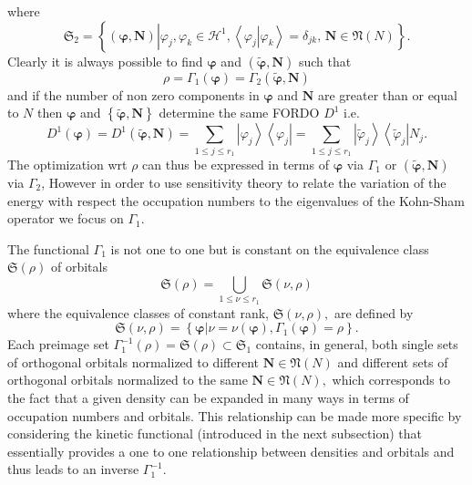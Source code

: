 \documentclass[aps,preprint]{revtex4}%
\begin{document}
where
\begin{equation}
\mathfrak{S}_{2}=\left\{  \left(  \boldsymbol{\varphi,N}\right)  \left\vert
\varphi_{j},\varphi_{k}\in\mathcal{H}^{1},\left\langle \left.  \varphi
_{j}\right\vert \varphi_{k}\right\rangle =\delta_{jk},\,\boldsymbol{N}%
\in\mathfrak{N}\left(  N\right)  \right.  \right\}  .\label{set2}%
\end{equation}
Clearly it is always possible to find $\boldsymbol{\varphi}$ and $\left(
\boldsymbol{\tilde{\varphi},N}\right)  $ such that
\begin{equation}
\rho=\Gamma_{1}\left(  \boldsymbol{\varphi}\right)  =\Gamma_{2}\left(
\boldsymbol{\tilde{\varphi},N}\right)
\end{equation}
and if the number of non zero components in $\boldsymbol{\varphi}$ and
$\boldsymbol{N}$ are greater than or equal to $N$ then $\boldsymbol{\varphi}$
and $\left\{  \boldsymbol{\tilde{\varphi},N}\right\}  $ determine the same
FORDO $D^{1}$ i.e.
\begin{equation}
D^{1}\left(  \boldsymbol{\varphi}\right)  =D^{1}\left(  \boldsymbol{\tilde
{\varphi},N}\right)  =\sum_{1\leq j\leq r_{1}}\left\vert \varphi
_{j}\right\rangle \left\langle \varphi_{j}\right\vert =\sum_{1\leq j\leq
r_{1}}\left\vert \tilde{\varphi}_{j}\right\rangle \left\langle \tilde{\varphi
}_{j}\right\vert N_{j}.
\end{equation}
The optimization wrt $\rho$ can thus be expressed in terms of
$\boldsymbol{\varphi}$ via $\Gamma_{1}$ or $\left(  \boldsymbol{\tilde
{\varphi},N}\right)  $ via $\Gamma_{2}$, However in order to use sensitivity
theory to relate the variation of the energy with respect the occupation
numbers to the eigenvalues of the Kohn-Sham operator we focus on $\Gamma_{1}.$

The functional $\Gamma_{1}$ is not one to one but is constant on the
equivalence class $\mathfrak{S}\left(  \rho\right)  $ of orbitals%
\begin{equation}
\mathfrak{S}\left(  \rho\right)  =\bigcup\limits_{1\leq\nu\leq r_{1}%
}\mathfrak{S}\left(  \nu,\rho\right)
\end{equation}
where the equivalence classes of constant rank, $\mathfrak{S}\left(  \nu
,\rho\right)  ,$ are defined by
\begin{equation}
\mathfrak{S}\left(  \nu,\rho\right)  =\left\{  \left.  \boldsymbol{\varphi
}\right\vert \nu=\nu\left(  \boldsymbol{\varphi}\right)  ,\Gamma_{1}\left(
\boldsymbol{\varphi}\right)  =\rho\right\}  .
\end{equation}
Each preimage set $\Gamma_{1}^{-1}\left(  \rho\right)  =\mathfrak{S}\left(
\rho\right)  \subset\mathfrak{S}_{1}$ contains, in general, both single sets
of orthogonal orbitals normalized to different $\boldsymbol{N}\in
\mathfrak{N}\left(  N\right)  $ and different sets of orthogonal orbitals
normalized to the same $\boldsymbol{N}\in\mathfrak{N}\left(  N\right)  ,$
which corresponds to the fact that a given density can be expanded in many
ways in terms of occupation numbers and orbitals. This relationship can be
made more specific by considering the kinetic functional (introduced in the
next subsection) that essentially provides a one to one relationship between
densities and orbitals and thus leads to an inverse $\Gamma_{1}^{-1}$.
\end{document}
